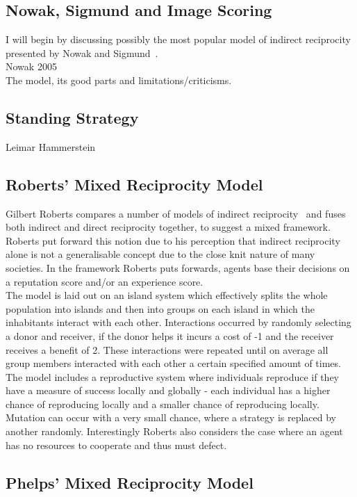 \documentclass[twoside,twocolumn]{article}
\begin{document}
\subsection{Nowak, Sigmund and Image Scoring}
I will begin by discussing possibly the most popular model of indirect reciprocity presented by Nowak and Sigmund~\cite{evol_indirect_image}.\\
Nowak 2005\\
The model, its good parts and limitations/criticisms.

\subsection{Standing Strategy}
Leimar Hammerstein\\


\subsection{Roberts' Mixed Reciprocity Model}
Gilbert Roberts compares a number of models of indirect reciprocity~\cite{evoldirindir} and fuses both indirect and direct reciprocity together, to suggest a mixed framework. Roberts put forward this notion due to his perception that indirect reciprocity alone is not a generalisable concept due to the close knit nature of many societies. In the framework Roberts puts forwards, agents base their decisions on a reputation score and/or an experience score.\\
The model is laid out on an island system which effectively splits the whole population into islands and then into groups on each island in which the inhabitants interact with each other. Interactions occurred by randomly selecting a donor and receiver, if the donor helps it incurs a cost of -1 and the receiver receives a benefit of 2. These interactions were repeated until on average all group members interacted with each other a certain specified amount of times.\\
The model includes a reproductive system where individuals reproduce if they have a measure of success locally and globally - each individual has a higher chance of reproducing locally and a smaller chance of reproducing locally. Mutation can occur with a very small chance, where a strategy is replaced by another randomly. Interestingly Roberts also considers the case where an agent has no resources to cooperate and thus must defect.\\

\subsection{Phelps' Mixed Reciprocity Model}
\end{document}
